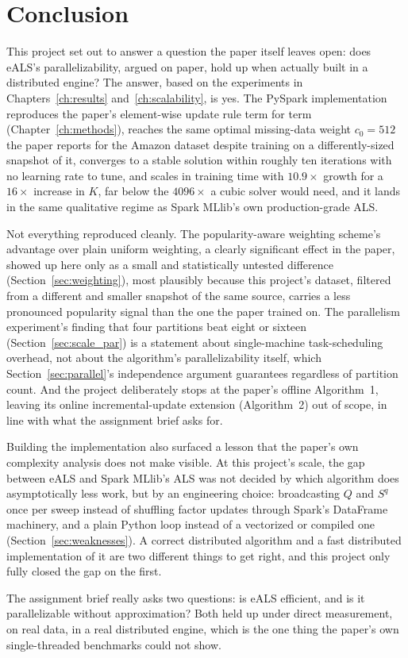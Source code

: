 \chapter{Conclusion}
\label{ch:conclusion}

This project set out to answer a question the paper itself leaves open:
does eALS's parallelizability, argued on paper, hold up when actually
built in a distributed engine? The answer, based on the experiments in
Chapters~\ref{ch:results} and~\ref{ch:scalability}, is yes. The PySpark
implementation reproduces the paper's element-wise update rule term for
term (Chapter~\ref{ch:methods}), reaches the same optimal missing-data
weight $c_0=512$ the paper reports for the Amazon dataset despite training
on a differently-sized snapshot of it, converges to a stable solution
within roughly ten iterations with no learning rate to tune, and scales in
training time with $10.9\times$ growth for a $16\times$ increase in $K$,
far below the $4096\times$ a cubic solver would need, and it lands in the
same qualitative regime as Spark MLlib's own production-grade ALS.

\medskip
Not everything reproduced cleanly. The popularity-aware weighting
scheme's advantage over plain uniform weighting, a clearly significant
effect in the paper, showed up here only as a small and statistically
untested difference (Section~\ref{sec:weighting}), most plausibly because
this project's dataset, filtered from a different and smaller snapshot of
the same source, carries a less pronounced popularity signal than the
one the paper trained on. The parallelism experiment's finding that four
partitions beat eight or sixteen (Section~\ref{sec:scale_par}) is a
statement about single-machine task-scheduling overhead, not about the
algorithm's parallelizability itself, which Section~\ref{sec:parallel}'s
independence argument guarantees regardless of partition count. And the
project deliberately stops at the paper's offline Algorithm~1, leaving its
online incremental-update extension (Algorithm~2) out of scope, in line
with what the assignment brief asks for.

\medskip
Building the implementation also surfaced a lesson that the paper's own
complexity analysis does not make visible. At this project's scale, the
gap between eALS and Spark MLlib's ALS was not decided by which algorithm
does asymptotically less work, but by an engineering choice: broadcasting
$Q$ and $S^q$ once per sweep instead of shuffling factor updates through
Spark's DataFrame machinery, and a plain Python loop instead of a
vectorized or compiled one (Section~\ref{sec:weaknesses}). A correct
distributed algorithm and a fast distributed implementation of it are two
different things to get right, and this project only fully closed the gap
on the first.

\medskip
The assignment brief really asks two questions: is eALS efficient, and is
it parallelizable without approximation? Both held up under direct
measurement, on real data, in a real distributed engine, which is the one
thing the paper's own single-threaded benchmarks could not show.
